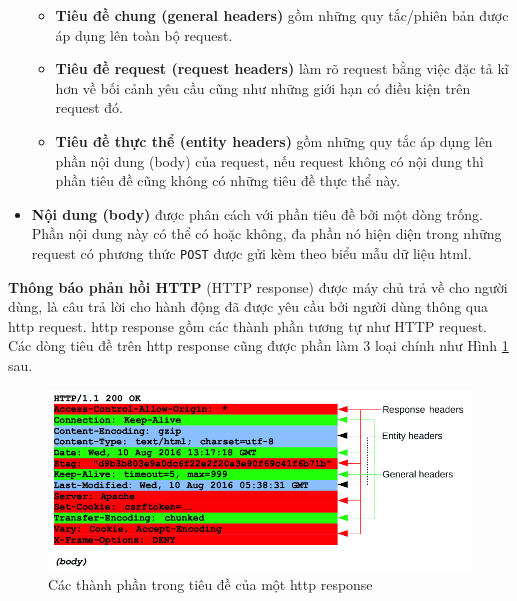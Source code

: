 \begin{itemize}
        \begin{itemize}
            \item \textbf{Tiêu đề chung (general headers)} gồm những quy tắc/phiên bản được áp dụng lên toàn bộ request.
            \item \textbf{Tiêu đề request (request headers)} làm rõ request bằng việc đặc tả kĩ hơn về bối cảnh yêu cầu cũng như những giới hạn có điều kiện trên request đó.
            \item \textbf{Tiêu đề thực thể (entity headers)} gồm những quy tắc áp dụng lên phần nội dung (body) của request, nếu request không có nội dung thì phần tiêu đề cũng không có những tiêu đề thực thể này.
        \end{itemize}
    \item \textbf{Nội dung (body)} được phân cách với phần tiêu đề bởi một dòng trống. Phần nội dung này có thể có hoặc không, đa phần nó hiện diện trong những request có phương thức \texttt{POST} được gửi kèm theo biểu mẫu dữ liệu \acrshort{html}.
\end{itemize}
\textbf{Thông báo phản hồi HTTP} (HTTP response) được máy chủ trả về  cho người dùng, là câu trả lời cho hành động đã được yêu cầu bởi người dùng thông qua \acrshort{http} request. \acrshort{http} response gồm các thành phần tương tự như HTTP request. Các dòng tiêu đề trên \acrshort{http} response cũng được phần làm 3 loại chính như Hình \ref{fig:HTTP-response-headers} sau.
\begin{figure}[H]
  \centering
    \includegraphics[width=\textwidth,keepaspectratio=true]{images/HTTP-response-headers.png}
  \caption[Các thành phần trong tiêu đề của một \acrshort{http} response]{Các thành phần trong tiêu đề của một \acrshort{http} response\protect\footnotemark}
  \label{fig:HTTP-response-headers}
\end{figure}

